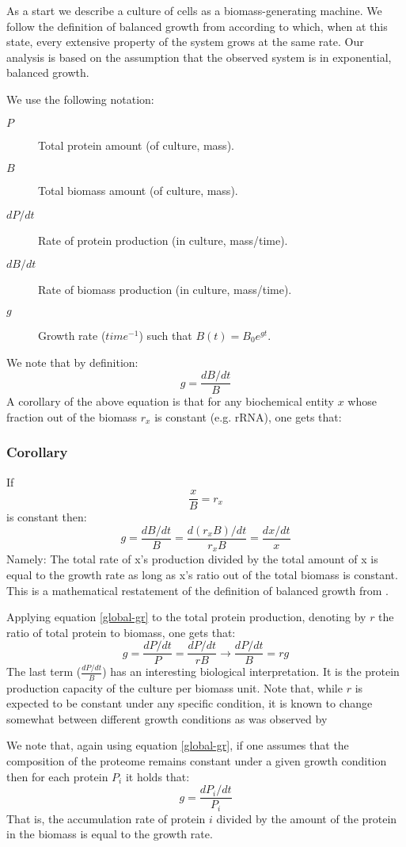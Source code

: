 \documentclass[a4page,notitlepage]{article}
\begin{document}
As a start we describe a culture of cells as a biomass-generating machine.
We follow the definition of balanced growth from \cite{Campbell1957} according to which, when at this state, every extensive property of the system grows at the same rate.
Our analysis is based on the assumption that the observed system is in exponential, balanced growth.

We use the following notation:
\begin{description}
\item[$P$] Total protein amount (of culture, mass).
\item[$B$] Total biomass amount (of culture, mass).
\item [$dP/dt$] Rate of protein production (in culture, mass/time).
\item [$dB/dt$] Rate of biomass production (in culture, mass/time).
\item [$g$] Growth rate ($time^{-1}$) such that $B(t)=B_0e^{gt}$.
\end{description}
We note that by definition:
\[ g=\frac{dB/dt}{B}\]
A corollary of the above equation is that for any biochemical entity $x$ whose fraction out of the biomass $r_x$ is constant (e.g. rRNA), one gets that:
\subsubsection{Corollary}
If
\[\frac{x}{B}=r_x\]
is constant then:
\begin{equation}
\label{global-gr}
g=\frac{dB/dt}{B}=\frac{d(r_xB)/dt}{r_xB}=\frac{dx/dt}{x}
\end{equation}
Namely: The total rate of x's production divided by the total amount of x is equal to the growth rate as long as x's ratio out of the total biomass is constant.
This is a mathematical restatement of the definition of balanced growth from \cite{Campbell1957}.

Applying equation \ref{global-gr} to the total protein production, denoting by $r$ the ratio of total protein to biomass, one gets that:
\[g=\frac{dP/dt}{P}=\frac{dP/dt}{rB}\rightarrow\frac{dP/dt}{B}=rg\]
The last term ($\frac{dP/dt}{B}$) has an interesting biological interpretation.
It is the protein production capacity of the culture per biomass unit.
Note that, while $r$ is expected to be constant under any specific condition, it is known to change somewhat between different growth conditions as was observed by \cite{Bremer1987}

We note that, again using equation \ref{global-gr}, if one assumes that the composition of the proteome remains constant under a given growth condition then for each protein $P_i$ it holds that:
\[g=\frac{dP_i/dt}{P_i}\]
That is, the accumulation rate of protein $i$ divided by the amount of the protein in the biomass is equal to the growth rate.
\end{document}
